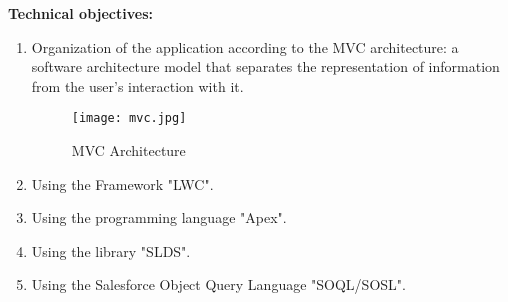 \textbf{Technical objectives:}
\begin{enumerate}
\item Organization of the application according to the MVC architecture: a software architecture model that separates the representation of information from the user's interaction with it.

\begin{figure}[H]%
    \center   
    \texttt{[image: mvc.jpg]}
    \caption{MVC Architecture}
\end{figure}

\item Using the Framework "LWC".
\item Using the programming language "Apex".
\item Using the library "SLDS".
\item Using the Salesforce Object Query Language "SOQL/SOSL".

\end{enumerate}
